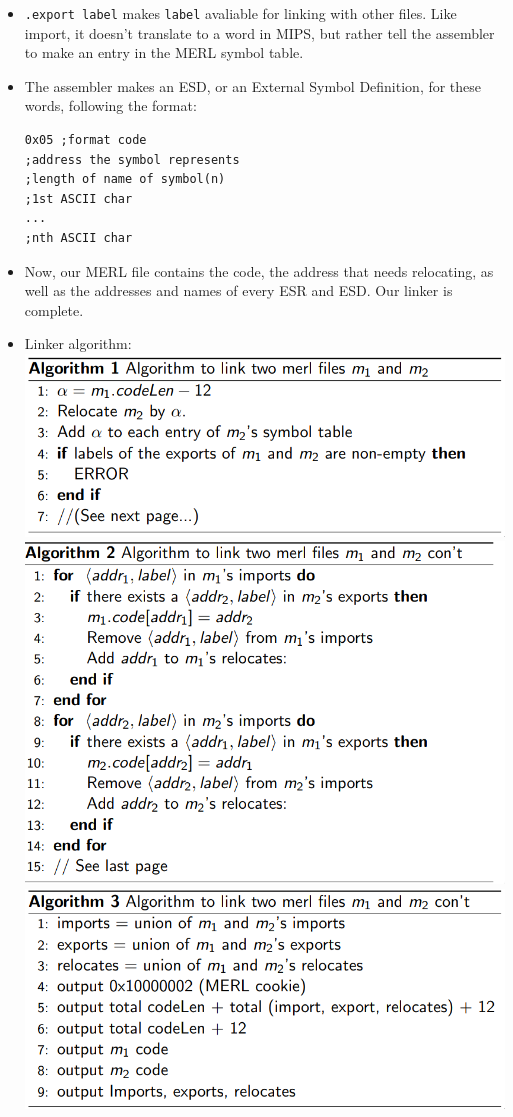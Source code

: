\documentclass[12pt]{article}
\begin{document}
\begin{itemize}
    \item \lstinline[mathescape]{.export label} makes \lstinline[mathescape]{label} avaliable for linking with other files.  Like import, it doesn't translate to a word in MIPS, but rather tell the assembler to make an entry in the MERL symbol table.
    \item The assembler makes an ESD, or an External Symbol Definition, for these words, following the format:
\begin{lstlisting}[mathescape, numbers=none, breaklines=true]
0x05 ;format code
;address the symbol represents
;length of name of symbol(n)
;1st ASCII char
...
;nth ASCII char
\end{lstlisting}
    \item Now, our MERL file contains the code, the address that needs relocating, as well as the addresses and names of every ESR and ESD.  Our linker is complete.
    \item Linker algorithm:\\
        \includegraphics[scale=0.5]{link_1.png}\\
        \includegraphics[scale=0.5]{link_2.png}\\
        \includegraphics[scale=0.5]{link_3.png}
\end{itemize}
\end{document}
